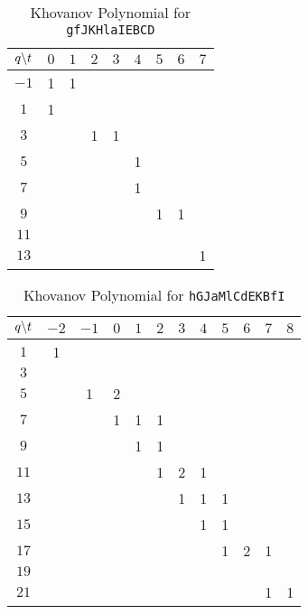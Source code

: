\documentclass{article}
\theoremstyle{plain}
\begin{document}
        \begin{table}[H]
            \centering
            \begin{tabular}{| c | c | c | c | c | c | c | c | c |}
                \hline
                $q\symbol{92}t$&$0$&$1$&$2$&$3$&$4$&$5$&$6$&$7$\\
                \hline
                $-1$&1&1&&&&&&\\
                \hline
                $1$&1&&&&&&&\\
                \hline
                $3$&&&1&1&&&&\\
                \hline
                $5$&&&&&1&&&\\
                \hline
                $7$&&&&&1&&&\\
                \hline
                $9$&&&&&&1&1&\\
                \hline
                $11$&&&&&&&&\\
                \hline
                $13$&&&&&&&&1\\
                \hline
            \end{tabular}
            \caption{Khovanov Polynomial for \texttt{gfJKHlaIEBCD}}
            \label{table:gfJKHlaIEBCD_kho}
        \end{table}
        \begin{table}[H]
            \centering
            \begin{tabular}{| c | c | c | c | c | c | c | c | c | c | c | c |}
                \hline
                $q\symbol{92}t$&$-2$&$-1$&$0$&$1$&$2$&$3$&$4$&$5$&$6$&$7$&$8$\\
                \hline
                $1$&1&&&&&&&&&&\\
                \hline
                $3$&&&&&&&&&&&\\
                \hline
                $5$&&1&2&&&&&&&&\\
                \hline
                $7$&&&1&1&1&&&&&&\\
                \hline
                $9$&&&&1&1&&&&&&\\
                \hline
                $11$&&&&&1&2&1&&&&\\
                \hline
                $13$&&&&&&1&1&1&&&\\
                \hline
                $15$&&&&&&&1&1&&&\\
                \hline
                $17$&&&&&&&&1&2&1&\\
                \hline
                $19$&&&&&&&&&&&\\
                \hline
                $21$&&&&&&&&&&1&1\\
                \hline
            \end{tabular}
            \caption{Khovanov Polynomial for \texttt{hGJaMlCdEKBfI}}
            \label{table:hGJaMlCdEKBfI_kho}
        \end{table}
\end{document}
